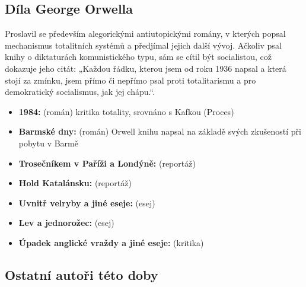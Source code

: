 \documentclass{article}
\newcommand{\point}[1]{\noindent \textbf{#1:}}
\begin{document}
\subsection{Díla George Orwella}
Proslavil se především alegorickými antiutopickými romány, v kterých popsal mechanismus totalitních systémů a 
předjímal jejich další vývoj. Ačkoliv psal knihy o diktaturách komunistického typu, sám se cítil být 
socialistou, což dokazuje jeho citát: „Každou řádku, kterou jsem od roku 1936 napsal a která stojí za zmínku, 
jsem přímo či nepřímo psal proti totalitarismu a pro demokratický socialismus, jak jej chápu.“. 

\begin{itemize}
    \item \point{1984} (román) kritika totality, srovnáno s Kafkou (Proces)   
    \item \point{Barmské dny} (román) Orwell knihu napsal na základě svých zkušeností při pobytu v Barmě
    \item \point{Trosečníkem v Paříži a Londýně} (reportáž)
    \item \point{Hold Katalánsku} (reportáž)
    \item \point{Uvnitř velryby a jiné eseje} (esej)
	\item \point{Lev a jednorožec} (esej)
	\item \point{Úpadek anglické vraždy a jiné eseje} (kritika)

\end{itemize}

\subsection{Ostatní autoři této doby}
\end{document}
